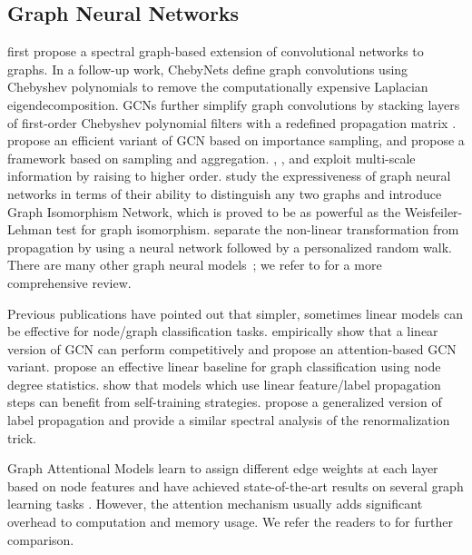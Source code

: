\documentclass{article}
\begin{document}
\subsection{Graph Neural Networks}
\citet{Bruna13} first propose a spectral graph-based extension of convolutional networks to graphs. 
In a follow-up work, ChebyNets \cite{Defferrard16} define graph convolutions using Chebyshev polynomials to remove the computationally expensive Laplacian eigendecomposition. GCNs \cite{gcn} further simplify graph convolutions by stacking layers of first-order Chebyshev polynomial filters with a redefined propagation matrix . 
\citet{FastGCN} propose an efficient variant of GCN based on importance sampling, and \citet{Hamilton17} propose a framework based on sampling and aggregation. 
\citet{dcnn}, \citet{n-gcn}, and \citet{liao2018lanczosnet} exploit multi-scale information by raising  to higher order.
\citet{xu2018how} study the expressiveness of graph neural networks in terms of their ability to distinguish any two graphs and introduce Graph Isomorphism Network, which is proved to be as powerful as the Weisfeiler-Lehman test for graph isomorphism. 
\citet{Klicpera19} separate the non-linear transformation from propagation by using a neural network followed by a personalized random walk.
There are many other graph neural models~\cite{Monet, EP17, Li18}; we refer to \citet{gnn_review, battaglia2018relational, wu2019comprehensive} for a more comprehensive review. 



Previous publications have pointed out that simpler, sometimes linear models can be effective for node/graph classification tasks. \citet{agnn} empirically show that a linear version of GCN can perform competitively and propose an attention-based GCN variant. \citet{cai2018simple} propose an effective linear baseline for graph classification using node degree statistics. \citet{Buchnik18} show that models which use linear feature/label propagation steps can benefit from self-training strategies. 
\citet{Li2019LabelES} propose a generalized version of label propagation and provide a similar spectral analysis of the renormalization trick.





Graph Attentional Models learn to assign different edge weights at each layer based on node features and have achieved state-of-the-art results on several graph learning tasks \citep{gat, agnn, zhang2018gaan, ADGPM}.
However, the attention mechanism usually adds significant overhead to computation and memory usage. 
We refer the readers to \citet{attention-survey} for further comparison.
\end{document}
